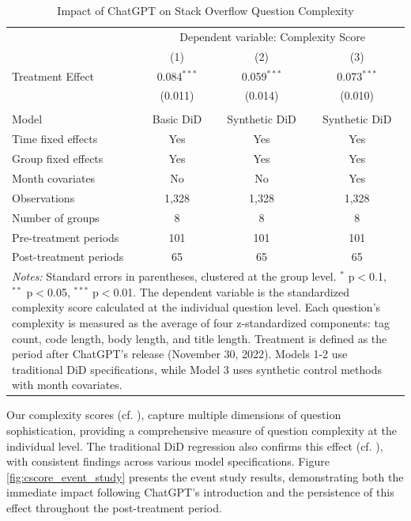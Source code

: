 \begin{table}[H]
    \centering
    \caption{Impact of ChatGPT on Stack Overflow Question Complexity}
    \label{tab:csscore_did_results}
    \begin{tabular}{lccc}
    \toprule
    & \multicolumn{3}{c}{Dependent variable: Complexity Score} \\
    \cmidrule(lr){2-4}
    & (1) & (2) & (3) \\
    \midrule
    Treatment Effect         & 0.084$^{***}$ & 0.059$^{***}$ & 0.073$^{***}$ \\
    & (0.011)       & (0.014)       & (0.010) \\
    &               &               & \\
    \midrule
    Model                    & Basic DiD     & Synthetic DiD & Synthetic DiD \\
    Time fixed effects       & Yes           & Yes           & Yes \\
    Group fixed effects      & Yes           & Yes           & Yes \\
    Month covariates         & No            & No            & Yes \\
    \midrule
    Observations             & 1,328         & 1,328         & 1,328 \\
    Number of groups         & 8             & 8             & 8 \\
    Pre-treatment periods    & 101           & 101           & 101 \\
    Post-treatment periods   & 65            & 65            & 65 \\
    \bottomrule
    \multicolumn{4}{p{1\linewidth}}{\footnotesize \textit{Notes:} Standard errors in parentheses, clustered at the group level. $^{*}$ p$<$0.1, $^{**}$ p$<$0.05, $^{***}$ p$<$0.01. The dependent variable is the standardized complexity score calculated at the individual question level. Each question's complexity is measured as the average of four z-standardized components: tag count, code length, body length, and title length. Treatment is defined as the period after ChatGPT's release (November 30, 2022). Models 1-2 use traditional DiD specifications, while Model 3 uses synthetic control methods with month covariates.} \\
    \end{tabular}
\end{table}

Our complexity scores (cf. ), capture multiple dimensions of question sophistication, providing a comprehensive measure of question complexity at the individual level. The traditional DiD regression also confirms this effect (cf. ), with consistent findings across various model specifications. Figure \ref{fig:cscore_event_study} presents the event study results, demonstrating both the immediate impact following ChatGPT's introduction and the persistence of this effect throughout the post-treatment period. 

